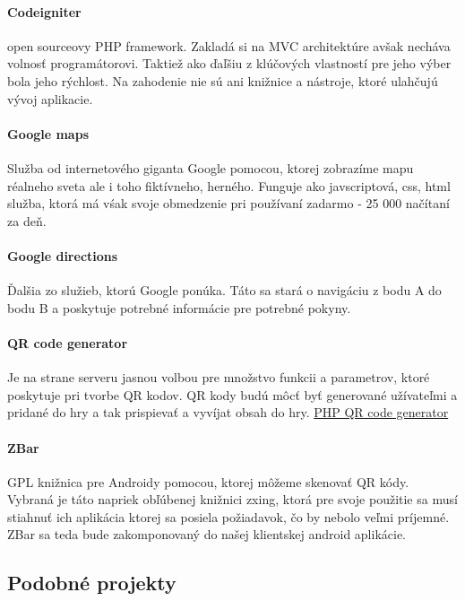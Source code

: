 \paragraph{Codeigniter} open sourceovy PHP framework. Zakladá si na MVC architektúre avšak necháva volnosť programátorovi. Taktiež ako ďaľšiu z klúčových vlastností pre jeho výber bola jeho rýchlost. Na zahodenie nie sú ani knižnice a nástroje, ktoré ulahčujú vývoj aplikacie.

\paragraph{Google maps} Služba od internetového giganta Google pomocou, ktorej zobrazíme mapu réalneho sveta ale i toho fiktívneho, herného. Funguje ako javscriptová, css, html služba, ktorá má vśak svoje obmedzenie pri používaní zadarmo - 25 000 načítaní za deň.

\paragraph{Google directions} Ďalšia zo služieb, ktorú Google ponúka. Táto sa stará o navigáciu z bodu A do bodu B a poskytuje potrebné informácie pre potrebné pokyny.

\paragraph{QR code generator} Je na strane serveru jasnou volbou pre množstvo funkcii a parametrov, ktoré poskytuje pri tvorbe QR kodov. QR kody budú môcť byť generované užívateľmi a pridané do hry a tak prispievať a vyvíjat obsah do hry.
\href{http://phpqrcode.sourceforge.net/examples/index.php?example=006}{PHP QR code generator} 

\paragraph{ZBar} GPL knižnica pre Androidy pomocou, ktorej môžeme skenovať QR kódy. Vybraná je táto napriek obľúbenej knižnici zxing, ktorá pre svoje použitie sa musí stiahnuť ich aplikácia ktorej sa posiela požiadavok, čo by nebolo veľmi príjemné. ZBar sa teda bude zakomponovaný do našej klientskej android aplikácie.


\subsection{Podobné projekty}


